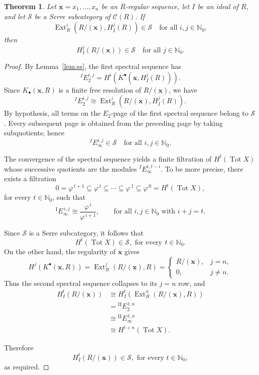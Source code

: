 \documentclass[12pt,twoside, final]{amsart}
\numberwithin{equation}{section}
\newtheorem{theorem}{Theorem}[section]
\theoremstyle{definition}
\newcommand{\Ext}{\operatorname{Ext}}
\newcommand{\NN}{\mathbb N_0}
\begin{document}
\begin{theorem}\label{thm:main2}
Let $\mathbf x=x_1,\ldots,x_n$ be an $R$-regular sequence, let $I$ be
an ideal of $R$, and let $\mathcal S$ be a Serre subcategory of
$\mathcal C(R)$. If
\[
\Ext_R^i(R/(\mathbf x),H_I^j(R))\in\mathcal S
\quad\text{for all }i,j\in\NN,
\]
  then
\[
H_I^j(R/(\mathbf x))\in\mathcal S  \quad\text{for all } j\in\NN.
\]
\end{theorem}

\begin{proof}
By Lemma~\ref{lem:ss}, the first spectral sequence has
\[
{}^IE_2^{i,j}
=
H^i(K^\bullet(\mathbf x,H_I^j(R))).
\]
Since $K_\bullet(\mathbf x,R)$ is a finite free resolution of
$R/(\mathbf x)$, we have
\[
{}^IE_2^{i,j}
\cong
\Ext_R^i(R/(\mathbf x),H_I^j(R)).
\]
By hypothesis, all terms on the $E_2$-page of the first spectral
sequence belong to $\mathcal S$. Every subsequent page is obtained
from the preceding page by taking subquotients; hence
\[
{}^IE_\infty^{i,j}\in\mathcal S \quad\text{for all } i, j\in\NN.
\] 

The convergence of the spectral sequence yields a finite filtration
of $H^t(\operatorname{Tot}X)$ whose successive quotients are the
modules ${}^IE_\infty^{i,t-i}$. To be more precise, there exists a filtration
\[
0=\varphi^{\,t+1}
\subseteq
\varphi^{\,t}
\subseteq
\cdots
\subseteq
\varphi^{\,1}
\subseteq
\varphi^{\,0}
=
H^{t}(\operatorname{Tot}X),
\]
for every \(t\in\mathbb{N}_{0}\), such that
\[
{}^{\mathrm{I}}E_{\infty}^{\,i,j}
\cong
\frac{\varphi^{\,i}}{\varphi^{\,i+1}},
\qquad
\text{for all } i,j\in\mathbb{N}_{0}
\text{ with } i+j=t.
\]


Since $\mathcal S$ is a Serre
subcategory, it follows that
\[
H^t(\operatorname{Tot}X)\in\mathcal S,\,\,\text{for every}\,\ t\in \NN.
\]
On the other hand, the regularity of $\mathbf x$ gives
\[
H^j(K^\bullet(\mathbf x,R))
= \operatorname{Ext}_R^j(R/(\mathbf x), R)= 
\begin{cases}
R/(\mathbf x),&j= n,\\
0,&j\neq n.
\end{cases}
\]
Thus the second spectral sequence collapses to its $j= n$ row, and
\begin{align*}
        H_I^t(R/(\mathbf x))&\cong H_I^t(\operatorname{Ext}_R^n(R/(\mathbf x), R))\\
       &=  {}^{\mathrm{II}}E_{2}^{\,t,n}\\
       &\cong {}^{\mathrm{II}}E_{\infty}^{\,t,n} \\
     & \cong H^{t+ n}(\operatorname{Tot}X).
\end{align*}
 
Therefore
\[
H_I^t(R/(\mathbf x))\in\mathcal S,\,\,\text{for every}\,\,  t\in\NN,
\]
 as required.
\end{proof}
\end{document}

